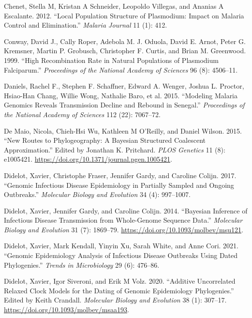 \documentclass[
  11pt,
]{article}
\newlength{\cslhangindent}
\newenvironment{CSLReferences}[2] %
 {\begin{list}{}{%
  \setlength{\itemindent}{0pt}
  \setlength{\leftmargin}{0pt}
  \setlength{\parsep}{0pt}
  \ifodd #1
   \setlength{\leftmargin}{\cslhangindent}
   \setlength{\itemindent}{-1\cslhangindent}
  \fi
  \setlength{\itemsep}{#2\baselineskip}}}
 {\end{list}}
\begin{document}
\begin{CSLReferences}{1}{0}
Chenet, Stella M, Kristan A Schneider, Leopoldo Villegas, and Ananias A
Escalante. 2012. {``Local Population Structure of Plasmodium: Impact on
Malaria Control and Elimination.''} \emph{Malaria Journal} 11 (1): 412.

Conway, David J., Cally Roper, Adebola M. J. Oduola, David E. Arnot,
Peter G. Kremsner, Martin P. Grobusch, Christopher F. Curtis, and Brian
M. Greenwood. 1999. {``High Recombination Rate in Natural Populations of
Plasmodium Falciparum.''} \emph{Proceedings of the National Academy of
Sciences} 96 (8): 4506--11.

Daniels, Rachel F., Stephen F. Schaffner, Edward A. Wenger, Joshua L.
Proctor, Hsiao-Han Chang, Willie Wong, Nathalie Baro, et al. 2015.
{``Modeling Malaria Genomics Reveals Transmission Decline and Rebound in
Senegal.''} \emph{Proceedings of the National Academy of Sciences} 112
(22): 7067--72.

De Maio, Nicola, Chieh-Hsi Wu, Kathleen M O'Reilly, and Daniel Wilson.
2015. {``New Routes to Phylogeography: A Bayesian Structured Coalescent
Approximation.''} Edited by Jonathan K. Pritchard. \emph{PLOS Genetics}
11 (8): e1005421. \url{https://doi.org/10.1371/journal.pgen.1005421}.

Didelot, Xavier, Christophe Fraser, Jennifer Gardy, and Caroline Colijn.
2017. {``Genomic Infectious Disease Epidemiology in Partially Sampled
and Ongoing Outbreaks.''} \emph{Molecular Biology and Evolution} 34 (4):
997--1007.

Didelot, Xavier, Jennifer Gardy, and Caroline Colijn. 2014. {``Bayesian
Inference of Infectious Disease Transmission from Whole-Genome Sequence
Data.''} \emph{Molecular Biology and Evolution} 31 (7): 1869--79.
\url{https://doi.org/10.1093/molbev/msu121}.

Didelot, Xavier, Mark Kendall, Yinyin Xu, Sarah White, and Anne Cori.
2021. {``Genomic Epidemiology Analysis of Infectious Disease Outbreaks
Using Dated Phylogenies.''} \emph{Trends in Microbiology} 29 (6):
476--86.

Didelot, Xavier, Igor Siveroni, and Erik M Volz. 2020. {``Additive
Uncorrelated Relaxed Clock Models for the Dating of Genomic Epidemiology
Phylogenies.''} Edited by Keith Crandall. \emph{Molecular Biology and
Evolution} 38 (1): 307--17.
\url{https://doi.org/10.1093/molbev/msaa193}.


\end{CSLReferences}
\end{document}
